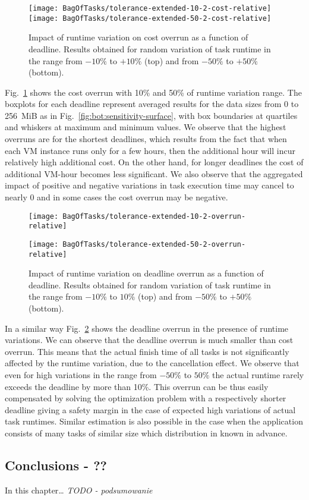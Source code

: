 {  \begin{figure}[tb]
     \centering
     \texttt{[image: BagOfTasks/tolerance-extended-10-2-cost-relative]}  
     \texttt{[image: BagOfTasks/tolerance-extended-50-2-cost-relative]}  
 	   \caption{Impact of runtime variation on cost overrun as a function of deadline. 
 	   Results obtained for random variation of task runtime in the range from $-10\%$ to $+10\%$ (top)
 	   and from $-50\%$ to $+50\%$ (bottom). }
 	   \label{fig:bot:dynamic-cost}
  \end{figure} 
  
  Fig.~\ref{fig:bot:dynamic-cost} shows the cost overrun with 10\% and 50\%  of runtime
  variation range.  The boxplots for each deadline represent averaged
  results for the data sizes from 0 to 256 MiB as in
  Fig.~\ref{fig:bot:sensitivity-surface}, with box boundaries at quartiles
  and whiskers at maximum and minimum values. We observe that the highest
  overruns are for the shortest deadlines, which results from the fact that
  when each VM instance runs only for a few hours, then the additional hour
  will incur relatively high additional cost. On the other hand, for longer
  deadlines the cost of additional VM-hour becomes less significant. We also
  observe that the aggregated impact of positive and negative variations in
  task execution time may cancel to nearly $0$ and in some cases the cost
  overrun may be negative.

  \begin{figure}[tb]
     \centering
     \texttt{[image: BagOfTasks/tolerance-extended-10-2-overrun-relative]}  
     
   \texttt{[image: BagOfTasks/tolerance-extended-50-2-overrun-relative]}  
 	   \caption{Impact of runtime variation on deadline overrun as a function of deadline. 
 	   Results obtained for random variation of task runtime in the range from $ -10\%$ to $10\%$ (top)
 	   and from $-50\%$ to $+50\%$ (bottom). }
 	   \label{fig:bot:dynamic-time}
  \end{figure} 

  In a similar way Fig.~\ref{fig:bot:dynamic-time} shows the deadline overrun in
  the presence of runtime variations. We can observe that the deadline overrun
  is much smaller than cost overrun. This means that the actual finish time of
  all tasks is not significantly affected by the runtime variation, due to the
  cancellation effect. We observe that even for high variations in the range
  from $-50\%$ to $50\%$ the actual runtime rarely exceeds the deadline by
  more than 10\%. This overrun can be thus easily compensated by solving the
  optimization problem with a respectively shorter deadline giving a safety
  margin in the case of expected high variations of actual task runtimes. Similar estimation is also possible in the case when the application consists of many tasks of similar size which distribution in known in advance. 
	


\subsection{Conclusions - ??}

In this chapter… \emph{TODO - podsumowanie}
	
} %
